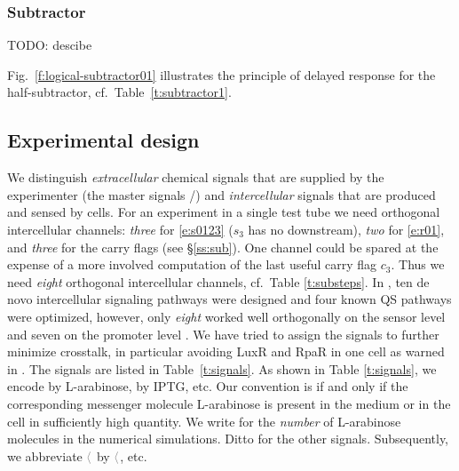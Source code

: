\documentclass[12pt,notitlepage]{article}
\newcommand{\TODO}[1]{\textrm{\color{red}TODO: #1}}
\newcommand{\cbra}[1]{{\ensuremath{\color{gray}{#1}}}}
\newcommand{\signal}[1]{{{\cbra{\langle}\ce{#1}\cbra{\rangle}}}}
\newcommand{\ra}[1]{{\color{Blue}#1}}
\begin{document}



\subsubsection*{Subtractor} \label{ss:sub}

\TODO{descibe}




%
Fig.~\ref{f:logical-subtractor01}
illustrates the principle of delayed response
for the half-subtractor,
cf.~Table~\ref{t:subtractor1}.








\subsection{Experimental design} \label{ss:experiment}

We distinguish
\emph{extracellular} chemical signals 
that are supplied by the experimenter
(the master signals /)
and
\emph{intercellular} signals
that are produced and sensed by cells.
%
%
%
For an experiment in a single test tube 
we need
orthogonal intercellular channels:
\emph{three} for \eqref{e:s0123}
($s_3$ has no downstream),
\emph{two} for \eqref{e:r01},
and
\emph{three} for the carry flags
(see \S\ref{ss:sub}).
%
One channel could be spared 
at the expense
of a more involved computation of 
the last useful carry flag $c_3$.
%
Thus we need \emph{eight} orthogonal intercellular channels,
cf.~Table \ref{t:substeps}.
%
In \cite{DuETAL2020},
ten de novo intercellular signaling pathways
were designed
and
four known QS pathways
were optimized,
however,
only \emph{eight} worked well orthogonally
on the sensor level 
and 
seven on the promoter level
\cite[\href{https://www.nature.com/articles/s41467-020-17993-w/figures/3}{Fig.~3c/g}]{DuETAL2020}.
%
We have tried to assign the signals
to further minimize crosstalk,
in particular 
avoiding LuxR and RpaR in one cell
as warned in \cite[p.6]{DuETAL2020}.
%
The signals are listed in
Table~\ref{t:signals}.
%
%
%
\ra{
As shown in Table \ref{t:signals},
we encode  by L-arabinose,
\ce{w_B} by IPTG, etc.
%
Our convention is \ce{w_A = 1}
if and only if
the corresponding messenger molecule L-arabinose 
is present in the medium or in the cell 
in sufficiently high quantity.
%
We write \ce{\#w_A}
for
the \emph{number} of L-arabinose molecules 
in the numerical simulations.
%
Ditto for the other signals.
}
%
%
\ra{
Subsequently, we abbreviate
\signal{{3OC6}{-}HSL} by \signal{{3OC6}}, etc.
}
%
\end{document}
